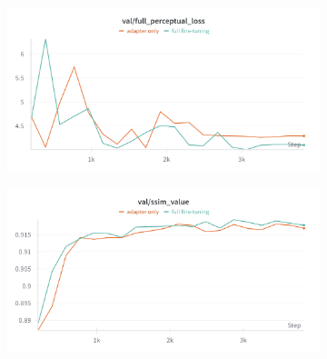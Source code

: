 \begin{figure}[htbp]
  \centering
  \begin{subfigure}[b]{0.48\textwidth}
    \centering
    \includegraphics[width=\textwidth]{images/experiments/adapter_vs_full/perceptual.png}
    \label{fig:exp_adap_vs_full_perceptual}
  \end{subfigure}
  \hfill
  \begin{subfigure}[b]{0.48\textwidth}
    \centering
    \includegraphics[width=\textwidth]{images/experiments/adapter_vs_full/ssim.png}
    \label{fig:exp_adap_vs_full_ssim}
  \end{subfigure}


\end{figure}
